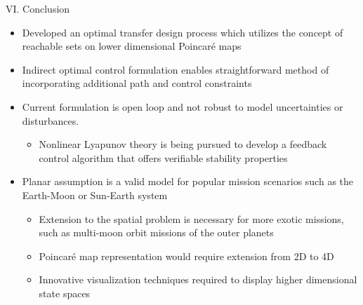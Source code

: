 \documentclass[final, usenames, dvipsnames]{beamer}
\newlength{\onecolwidth}
\begin{document}
\begin{frame}[t]
\begin{columns}[T,onlytextwidth]
\begin{column}{\onecolwidth}
\begin{block}{VI. Conclusion} %
	\begin{itemize}
		\item Developed an optimal transfer design process which utilizes the concept of reachable sets on lower dimensional Poincar\'e maps
		\item Indirect optimal control formulation enables straightforward method of incorporating additional path and control constraints
		\item Current formulation is open loop and not robust to model uncertainties or disturbances. 
			\begin{itemize}
				\item Nonlinear Lyapunov theory is being pursued to develop a feedback control algorithm that offers verifiable stability properties
			\end{itemize}
		\item Planar assumption is a valid model for popular mission scenarios such as the Earth-Moon or Sun-Earth system
			\begin{itemize}
				\item Extension to the spatial problem is necessary for more exotic missions, such as multi-moon orbit missions of the outer planets
				\item Poincar\'e map representation would require extension from 2D to 4D 
				\item Innovative visualization techniques required to display higher dimensional state spaces
			\end{itemize}
	\end{itemize}
\end{block} %
\end{column}  %

\end{columns} %
\end{frame} %
\end{document}
